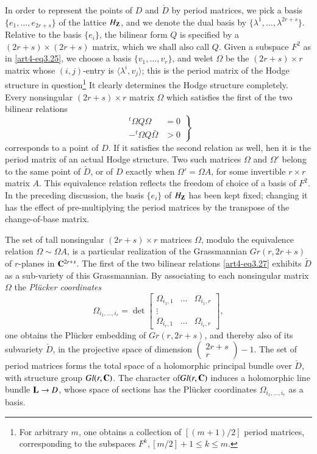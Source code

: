 In order to represent the points of $D$ and $\check{D}$ by period matrices, we pick a basis $\{e_1,\ldots, e_{2r+s}\}$ of the lattice $H_{\mathbf{Z}}$, and we denote the dual basis by $\{\lambda^1, \ldots, \lambda^{2r+s}\}$. Relative to the basis $\{e_i\}$, the bilinear form $Q$ is specified by a $(2r+s) \times (2r+s)$ matrix, which we shall also call $Q$. Given a subspace $F^2$ as in \eqref{art4-eq3.25}, we choose a basis $\{v_1, \ldots, v_r\}$, and we\pageoriginale let $\Omega$ be the $(2r+s) \times r$ matrix whose $(i,j)$-entry is $\langle \lambda^i, v_j\rangle $; this is the period matrix of the Hodge structure in question\footnote[14]{For arbitrary $m$, one obtains a collection of $[(m+1)/2]$ period matrices, corresponding to the subspaces $F^k, [m/2] +  1 \leqslant k \leqslant m$.} It clearly determines the Hodge structure completely. Every nonsingular $(2r+s) \times r$ matrix $\Omega$ which satisfies the first of the two bilinear relations
\begin{equation}
\left.
\begin{aligned}
{}^t \Omega Q \Omega & = 0\\
- {}^t \Omega Q \bar{\Omega} & > 0
\end{aligned}
\right\}\label{art4-eq3.27}
\end{equation}
corresponds to a point of $D$. If it satisfies the second relation as well, hen it is the period matrix of an actual Hodge structure. Two such matrices $\Omega$ and $\Omega'$ belong to the same point of $\check{D}$, or of $D$ exactly when $\Omega' = \Omega A$, for some invertible $r \times r$ matrix $A$. This equivalence relation reflects the freedom of choice of a basis of $F^2$. In the preceding discussion, the basis $\{e_i\}$ of $H_{\mathbf{Z}}$ has been kept fixed; changing it has the effect of pre-multiplying the period matrices by the transpose of the change-of-base matrix.

The set of tall nonsingular $(2r+s) \times r$ matrices $\Omega$, modulo the equivalence relation $\Omega \sim \Omega A$, is a particular realization of the Grassmannian $Gr (r, 2r + s)$ of $r$-planes in $\mathbf{C}^{2r+s}$. The first of the two bilinear relations \eqref{art4-eq3.27} exhibits $\check{D}$ as a sub-variety of this Grassmannian. By associating to each nonsingular matrix $\Omega$ the \textit{Pl\"ucker coordinates}
$$
\Omega_{i_1, \ldots ,i_r} = \det 
\begin{bmatrix}
\Omega_{i_1, 1} & \ldots & \Omega_{i_1, r}\\
\vdots & & \\
\Omega_{i_r,1} &  \ldots & \Omega_{i_r, r}
\end{bmatrix},
$$
one obtains the Pl\"ucker embedding of $Gr (r, 2r + s)$, and thereby also of its subvariety $\check{D}$, in the projective space of dimension $\begin{pmatrix}2r + s\\r\end{pmatrix}- 1$. The set of period matrices forms the total space of a holomorphic principal bundle over $\check{D}$, with structure group $Gl(r,\mathbf{C})$. The character of\pageoriginale $Gl(r,\mathbf{C})$ induces a holomorphic line bundle $\mathbf{L} \to D$, whose space of sections has the Pl\"{u}cker coordinates $\Omega_{i_1, \ldots, i_r} $ as a basis.

